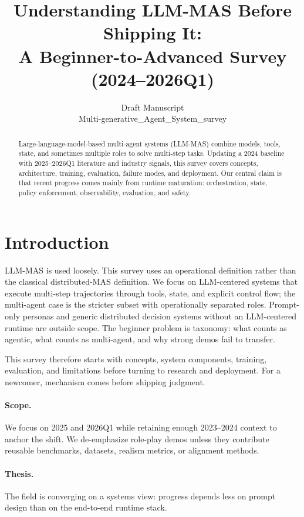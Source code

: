 \documentclass[11pt]{article}
\title{Understanding LLM-MAS Before Shipping It:\\A Beginner-to-Advanced Survey (2024--2026Q1)}
\author{Draft Manuscript\\
  Multi-generative\_Agent\_System\_survey}
\begin{document}
\maketitle

\begin{abstract}
Large-language-model-based multi-agent systems (LLM-MAS) combine models, tools, state, and sometimes multiple roles to solve multi-step tasks. Updating a 2024 baseline with 2025--2026Q1 literature and industry signals, this survey covers concepts, architecture, training, evaluation, failure modes, and deployment. Our central claim is that recent progress comes mainly from runtime maturation: orchestration, state, policy enforcement, observability, evaluation, and safety.
\end{abstract}

\section{Introduction}
LLM-MAS is used loosely. This survey uses an operational definition rather than the classical distributed-MAS definition. We focus on LLM-centered systems that execute multi-step trajectories through tools, state, and explicit control flow; the multi-agent case is the stricter subset with operationally separated roles. Prompt-only personas and generic distributed decision systems without an LLM-centered runtime are outside scope. The beginner problem is taxonomy: what counts as agentic, what counts as multi-agent, and why strong demos fail to transfer.

This survey therefore starts with concepts, system components, training, evaluation, and limitations before turning to research and deployment. For a newcomer, mechanism comes before shipping judgment.

\paragraph{Scope.}
We focus on 2025 and 2026Q1 while retaining enough 2023--2024 context to anchor the shift. We de-emphasize role-play demos unless they contribute reusable benchmarks, datasets, realism metrics, or alignment methods.

\paragraph{Thesis.}
The field is converging on a systems view: progress depends less on prompt design than on the end-to-end runtime stack.
\end{document}
